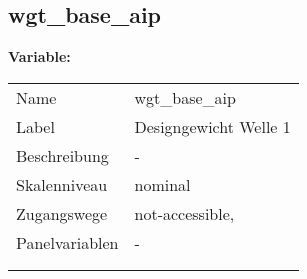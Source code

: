 	
	
	\subsection{wgt\_base\_aip}
	\label{subSection:wgt_base_aip}

	\noindent\textbf{Variable:}\\
		\begin{tabular}{lL{11.3cm}}
			\label{tableVariable:wgt_base_aip}
			Name & wgt\_base\_aip \\
			Label & Designgewicht Welle 1 \\
			Beschreibung & - \\
			Skalenniveau & nominal \\
			Zugangswege &
				not-accessible,
 \\
			Panelvariablen & -
			 \\
			 \\
 \\
		\end{tabular}






	
	\newpage
